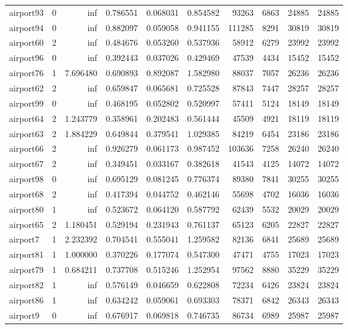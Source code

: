 \begin{longtable}{|l|r|r|r|r|r|r|r|r|r|}
airport93 & 0 & inf & 0.786551 & 0.068031 & 0.854582 & 93263 & 6863 & 24885 & 24885 \\
airport94 & 0 & inf & 0.882097 & 0.059058 & 0.941155 & 111285 & 8291 & 30819 & 30819 \\
airport60 & 2 & inf & 0.484676 & 0.053260 & 0.537936 & 58912 & 6279 & 23992 & 23992 \\
airport96 & 0 & inf & 0.392443 & 0.037026 & 0.429469 & 47539 & 4434 & 15452 & 15452 \\
airport76 & 1 & 7.696480 & 0.690893 & 0.892087 & 1.582980 & 88037 & 7057 & 26236 & 26236 \\
airport62 & 2 & inf & 0.659847 & 0.065681 & 0.725528 & 87843 & 7447 & 28257 & 28257 \\
airport99 & 0 & inf & 0.468195 & 0.052802 & 0.520997 & 57411 & 5124 & 18149 & 18149 \\
airport64 & 2 & 1.243779 & 0.358961 & 0.202483 & 0.561444 & 45509 & 4921 & 18119 & 18119 \\
airport63 & 2 & 1.884229 & 0.649844 & 0.379541 & 1.029385 & 84219 & 6454 & 23186 & 23186 \\
airport66 & 2 & inf & 0.926279 & 0.061173 & 0.987452 & 103636 & 7258 & 26240 & 26240 \\
airport67 & 2 & inf & 0.349451 & 0.033167 & 0.382618 & 41543 & 4125 & 14072 & 14072 \\
airport98 & 0 & inf & 0.695129 & 0.081245 & 0.776374 & 89380 & 7841 & 30255 & 30255 \\
airport68 & 2 & inf & 0.417394 & 0.044752 & 0.462146 & 55698 & 4702 & 16036 & 16036 \\
airport80 & 1 & inf & 0.523672 & 0.064120 & 0.587792 & 62439 & 5532 & 20029 & 20029 \\
airport65 & 2 & 1.180451 & 0.529194 & 0.231943 & 0.761137 & 65123 & 6205 & 22827 & 22827 \\
airport7 & 1 & 2.232392 & 0.704541 & 0.555041 & 1.259582 & 82136 & 6841 & 25689 & 25689 \\
airport81 & 1 & 1.000000 & 0.370226 & 0.177074 & 0.547300 & 47471 & 4755 & 17023 & 17023 \\
airport79 & 1 & 0.684211 & 0.737708 & 0.515246 & 1.252954 & 97562 & 8880 & 35229 & 35229 \\
airport82 & 1 & inf & 0.576149 & 0.046659 & 0.622808 & 72234 & 6426 & 23824 & 23824 \\
airport86 & 1 & inf & 0.634242 & 0.059061 & 0.693303 & 78371 & 6842 & 26343 & 26343 \\
airport9 & 0 & inf & 0.676917 & 0.069818 & 0.746735 & 86734 & 6989 & 25987 & 25987 \\

\end{longtable}
